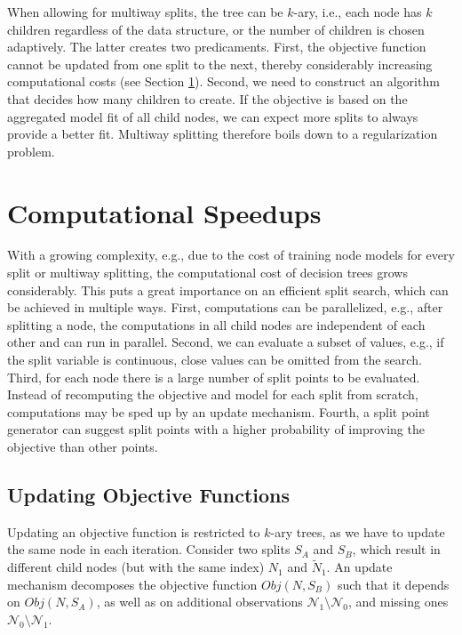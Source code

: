 \documentclass[a4paper, 11pt]{article}
\begin{document}
\par
When allowing for multiway splits, the tree can be $k$-ary, i.e., each node has $k$ children regardless of the data structure, or the number of children is chosen adaptively. The latter creates two predicaments. First, the objective function cannot be updated from one split to the next, thereby considerably increasing computational costs (see Section \ref{sec:computational_speedups}). Second, we need to construct an algorithm that decides how many children to create. If the objective is based on the aggregated model fit of all child nodes, we can expect more splits to always provide a better fit. Multiway splitting therefore boils down to a regularization problem.

\section{Computational Speedups}
\label{sec:computational_speedups}

With a growing complexity, e.g., due to the cost of training node models for every split or multiway splitting, the computational cost of decision trees grows considerably. This puts a great importance on an efficient split search, which can be achieved in multiple ways.
First, computations can be parallelized, e.g., after splitting a node, the computations in all child nodes are independent of each other and can run in parallel.
Second, we can evaluate a subset of values, e.g., if the split variable is continuous, close values can be omitted from the search.
Third, for each node there is a large number of split points to be evaluated. Instead of recomputing the objective and model for each split from scratch, computations may be sped up by an update mechanism. Fourth, a split point generator can suggest split points with a higher probability of improving the objective than other points.

\subsection{Updating Objective Functions}

Updating an objective function is restricted to $k$-ary trees, as we have to update the same node in each iteration. Consider two splits $S_A$ and $S_B$, which result in different child nodes (but with the same index) $N_1$ and $\tilde{N}_1$. An update mechanism decomposes the objective function $Obj(N, S_B)$ such that it depends on $Obj(N, S_A)$, as well as on additional observations $\mathcal{N}_1 \setminus \mathcal{N}_0$, and missing ones $\mathcal{N}_0 \setminus \mathcal{N}_1$. 
\end{document}
